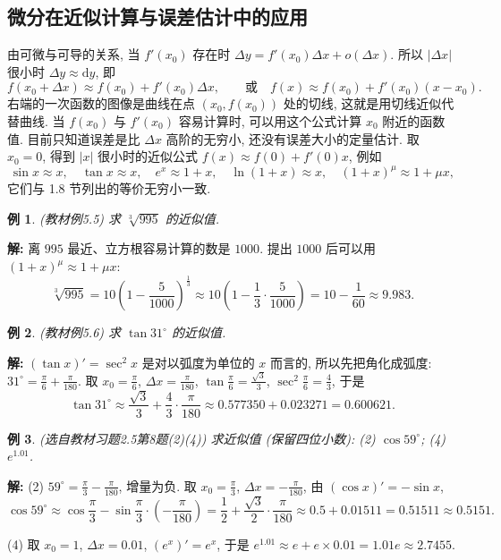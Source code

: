 \documentclass[UTF8,openany]{ctexbook}
\theoremstyle{chinesetextbook}
\newtheorem{example}{例}[section]
\newenvironment{cnsolution}{\par\indent\textbf{解:} \ignorespaces}{\par}
\newcommand{\dd}{\mathrm d}
\begin{document}
\subsection{微分在近似计算与误差估计中的应用}
由可微与可导的关系, 当 $f'(x_0)$ 存在时 $\Delta y=f'(x_0)\Delta x+o(\Delta x)$. 所以 $|\Delta x|$ 很小时 $\Delta y\approx\dd y$, 即
\[
f(x_0+\Delta x)\approx f(x_0)+f'(x_0)\Delta x,\qquad\text{或}\quad f(x)\approx f(x_0)+f'(x_0)(x-x_0).
\]
右端的一次函数的图像是曲线在点 $(x_0,f(x_0))$ 处的切线, 这就是用切线近似代替曲线. 当 $f(x_0)$ 与 $f'(x_0)$ 容易计算时, 可以用这个公式计算 $x_0$ 附近的函数值. 目前只知道误差是比 $\Delta x$ 高阶的无穷小, 还没有误差大小的定量估计. 取 $x_0=0$, 得到 $|x|$ 很小时的近似公式 $f(x)\approx f(0)+f'(0)x$, 例如
\[
\sin x\approx x,\quad\tan x\approx x,\quad e^x\approx1+x,\quad\ln(1+x)\approx x,\quad(1+x)^\mu\approx1+\mu x,
\]
它们与 1.8 节列出的等价无穷小一致.
\begin{example}\label{ex:c2-5-5}
\textnormal{(教材例5.5)} 求 $\sqrt[3]{995}$ 的近似值.
\end{example}
\begin{cnsolution}
离 $995$ 最近、立方根容易计算的数是 $1000$. 提出 $1000$ 后可以用 $(1+x)^\mu\approx1+\mu x$:
\[
\sqrt[3]{995}=10\left(1-\frac5{1000}\right)^{\frac13}\approx10\left(1-\frac13\cdot\frac5{1000}\right)=10-\frac1{60}\approx9.983.
\]
\end{cnsolution}
\begin{example}\label{ex:c2-5-6}
\textnormal{(教材例5.6)} 求 $\tan31^\circ$ 的近似值.
\end{example}
\begin{cnsolution}
$(\tan x)'=\sec^2x$ 是对以弧度为单位的 $x$ 而言的, 所以先把角化成弧度: $\displaystyle31^\circ=\frac\pi6+\frac\pi{180}$. 取 $\displaystyle x_0=\frac\pi6$, $\displaystyle\Delta x=\frac\pi{180}$, $\displaystyle\tan\frac\pi6=\frac{\sqrt3}3$, $\displaystyle\sec^2\frac\pi6=\frac43$, 于是
\[
\tan31^\circ\approx\frac{\sqrt3}3+\frac43\cdot\frac\pi{180}\approx0.577350+0.023271=0.600621.
\]
\end{cnsolution}
\begin{example}\label{ex:c2-h5-8}
\textnormal{(选自教材习题2.5第8题(2)(4))} 求近似值 (保留四位小数): (2) $\cos59^\circ$; (4) $e^{1.01}$.
\end{example}
\begin{cnsolution}
(2) $\displaystyle59^\circ=\frac\pi3-\frac\pi{180}$, 增量为负. 取 $\displaystyle x_0=\frac\pi3$, $\displaystyle\Delta x=-\frac\pi{180}$, 由 $(\cos x)'=-\sin x$,
\[
\cos59^\circ\approx\cos\frac\pi3-\sin\frac\pi3\cdot\left(-\frac\pi{180}\right)=\frac12+\frac{\sqrt3}2\cdot\frac\pi{180}\approx0.5+0.01511=0.51511\approx0.5151.
\]

(4) 取 $x_0=1$, $\Delta x=0.01$, $(e^x)'=e^x$, 于是 $e^{1.01}\approx e+e\times0.01=1.01e\approx2.7455$.
\end{cnsolution}
\end{document}
